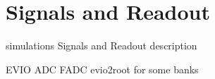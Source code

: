 \section{Signals and Readout}

simulations Signals and Readout description

EVIO
ADC
FADC
evio2root for some banks


